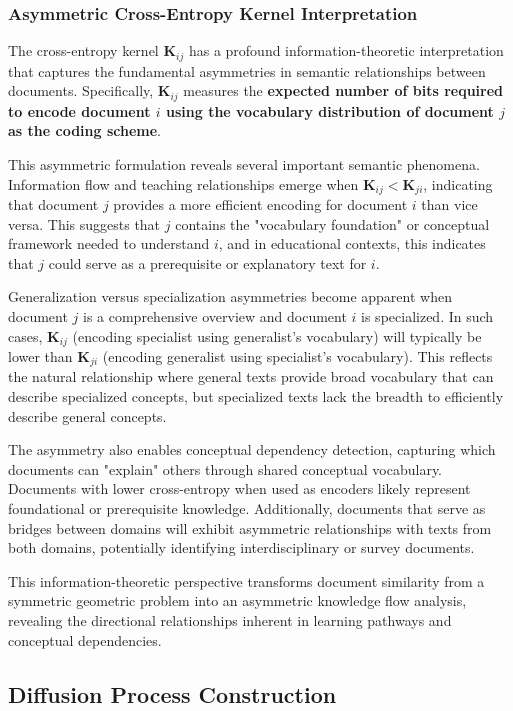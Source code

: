 \documentclass[12pt,a4paper]{article}
\begin{document}
\subsubsection{Asymmetric Cross-Entropy Kernel Interpretation}

The cross-entropy kernel $\mathbf{K}_{ij}$ has a profound information-theoretic interpretation that captures the fundamental asymmetries in semantic relationships between documents. Specifically, $\mathbf{K}_{ij}$ measures the \textbf{expected number of bits required to encode document $i$ using the vocabulary distribution of document $j$ as the coding scheme}.

This asymmetric formulation reveals several important semantic phenomena. Information flow and teaching relationships emerge when $\mathbf{K}_{ij} < \mathbf{K}_{ji}$, indicating that document $j$ provides a more efficient encoding for document $i$ than vice versa. This suggests that $j$ contains the "vocabulary foundation" or conceptual framework needed to understand $i$, and in educational contexts, this indicates that $j$ could serve as a prerequisite or explanatory text for $i$.

Generalization versus specialization asymmetries become apparent when document $j$ is a comprehensive overview and document $i$ is specialized. In such cases, $\mathbf{K}_{ij}$ (encoding specialist using generalist's vocabulary) will typically be lower than $\mathbf{K}_{ji}$ (encoding generalist using specialist's vocabulary). This reflects the natural relationship where general texts provide broad vocabulary that can describe specialized concepts, but specialized texts lack the breadth to efficiently describe general concepts.

The asymmetry also enables conceptual dependency detection, capturing which documents can "explain" others through shared conceptual vocabulary. Documents with lower cross-entropy when used as encoders likely represent foundational or prerequisite knowledge. Additionally, documents that serve as bridges between domains will exhibit asymmetric relationships with texts from both domains, potentially identifying interdisciplinary or survey documents.

This information-theoretic perspective transforms document similarity from a symmetric geometric problem into an asymmetric knowledge flow analysis, revealing the directional relationships inherent in learning pathways and conceptual dependencies.

\subsection{Diffusion Process Construction}
\end{document}
